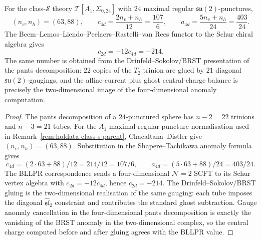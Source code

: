 \begin{proposition}
\label{prop:holdata-class-s-bllpr-ds-central-charge}
For the class-\(\mathcal S\) theory
\(\mathcal T[A_1,\Sigma_{0,24}]\) with \(24\) maximal regular
\(\mathfrak{su}(2)\)-punctures,
\[
 (n_v,n_h)=(63,88),\qquad
 c_{4d}=\frac{2n_v+n_h}{12}=\frac{107}{6},\qquad
 a_{4d}=\frac{5n_v+n_h}{24}=\frac{403}{24}.
\]
The Beem--Lemos--Liendo--Peelaers--Rastelli--van Rees functor to the
Schur chiral algebra gives
\[
 c_{2d}=-12c_{4d}=-214.
\]
The same number is obtained from the Drinfeld--Sokolov/BRST
presentation of the pants decomposition: \(22\) copies of the
\(T_2\) trinion are glued by \(21\) diagonal
\(\mathfrak{su}(2)\)-gaugings, and the affine-current plus ghost
central-charge balance is precisely the two-dimensional image of the
four-dimensional anomaly computation.
\end{proposition}

\begin{proof}
The pants decomposition of a \(24\)-punctured sphere has
\(n-2=22\) trinions and \(n-3=21\) tubes. For the \(A_1\) maximal
regular puncture normalisation used in
Remark~\ref{rem:holdata-class-s-parent}, Chacaltana--Distler give
\((n_v,n_h)=(63,88)\). Substitution in the Shapere--Tachikawa anomaly
formula gives
\[
 c_{4d}=(2\cdot 63+88)/12=214/12=107/6,\qquad
 a_{4d}=(5\cdot 63+88)/24=403/24 .
\]
The BLLPR correspondence sends a four-dimensional \(\mathcal N=2\)
SCFT to its Schur vertex algebra with \(c_{2d}=-12c_{4d}\), hence
\(c_{2d}=-214\). The Drinfeld--Sokolov/BRST gluing is the
two-dimensional realisation of the same gauging: each tube imposes the
diagonal \(\widehat{\mathfrak{sl}}_2\) constraint and contributes the
standard ghost subtraction. Gauge anomaly cancellation in the
four-dimensional pants decomposition is exactly the vanishing of the
BRST anomaly in the two-dimensional complex, so the central charge
computed before and after gluing agrees with the BLLPR value.
\end{proof}

